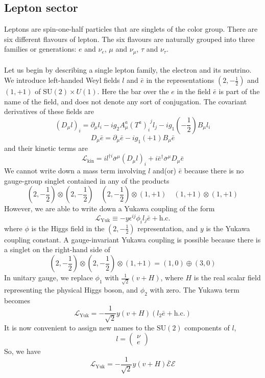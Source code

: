 \subsection{Lepton sector}
Leptons are spin-one-half particles that are singlets of the color group. There are six different flavours of lepton. The six flavours are naturally grouped into three families or generations: $e$ and $\nu_e$, $\mu$ and $\nu_{\mu}$, $\tau$ and $\nu_{\tau}$.
\\ \\
Let us begin by describing a single lepton family, the electron and its neutrino. We introduce left-handed Weyl fields $l$ and $\bar{e}$ in the representations $(2,-\frac{1}{2})$ and $(1,+1)$ of $\mathrm{SU}(2)\times U(1)$. 
Here the bar over the $e$ in the field $\bar{e}$ is part of the name of the field, and does not denote any sort of conjugation. The covariant derivatives of these fields are
\[(D_{\mu}l)_i = \partial_{\mu}l_i - ig_2A^a_{\mu}(T^a)_{i}^{\phantom{j}j}l_j - ig_1(-\frac{1}{2})B_{\mu}l_i\]
\[D_{\mu}\bar{e} = \partial_{\mu}\bar{e} - ig_1(+1)B_{\mu}\bar{e}\]
and their kinetic terms are
\[\mathcal{L}_{\mathrm{kin}} = il^{\dagger i} \overline{\sigma}^{\mu}(D_{\mu}l)_i + i\bar{e}^{\dagger}\overline{\sigma}^{\mu}D_{\mu}\bar{e}\]
We cannot write down a mass term involving $l$ and(or) $\bar{e}$ because there is no gauge-group singlet contained in any of the products
\[(2,-\frac{1}{2}) \otimes (2,-\frac{1}{2}) \quad (2,-\frac{1}{2}) \otimes (1, +1) \quad (1, +1) \otimes (1, +1)\]
However, we are able to write down a Yukawa coupling of the form
\[\mathcal{L}_{\mathrm{Yuk}} \equiv -y\epsilon^{ij}\phi_i l_j \bar{e} + \mathrm{h.c.}\]
where $\phi$ is the Higgs field in the $(2,-\frac{1}{2})$ representation, and $y$ is the Yukawa coupling constant. A gauge-invariant Yukawa coupling is possible because there is a singlet on the right-hand side of
\[(2,-\frac{1}{2}) \otimes (2,-\frac{1}{2}) \otimes (1,+1) = (1,0) \oplus (3,0)\]
In unitary gauge, we replace $\phi_1$ with $\frac{1}{\sqrt{2}}(v+H)$, where $H$ is the real scalar field representing the physical Higgs boson, and $\phi_2$ with zero. The Yukawa term becomes
\[\mathcal{L}_{\mathrm{Yuk}} = -\frac{1}{\sqrt{2}}y(v+H)(l_2\bar{e} + \mathrm{h.c.})\]
It is now convenient to assign new names to the $\mathrm{SU}(2)$ components of $l$,
\[l = \begin{pmatrix}
\nu \\ e
\end{pmatrix} \]
So, we have
\[\mathcal{L}_{\mathrm{Yuk}} = -\frac{1}{\sqrt{2}}y(v+H)\overline{\mathcal{E}}\mathcal{E}\]

